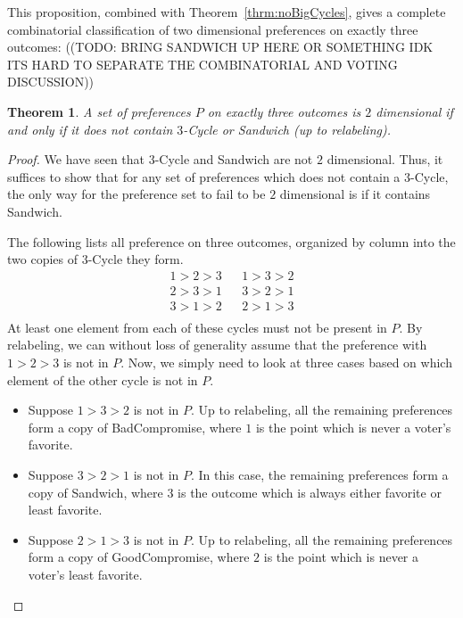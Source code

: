 \documentclass[12pt]{article}
\newtheorem{theorem}{Theorem}
\newcommand{\1}[1]{\mathds{1}[{#1}]}
\begin{document}
    This proposition, combined with Theorem~\ref{thrm:noBigCycles}, gives a
    complete combinatorial classification of two dimensional preferences on
    exactly three outcomes:
    ((TODO: BRING SANDWICH UP HERE OR SOMETHING IDK ITS HARD TO SEPARATE THE
    COMBINATORIAL AND VOTING DISCUSSION))
    \begin{theorem}
      A set of preferences $P$ on exactly three outcomes is $2$ dimensional if
      and only if it does not contain $3$-{\sc Cycle} or {\sc Sandwich} 
      (up to relabeling).
    \end{theorem}
    \begin{proof}
      We have seen that $3$-{\sc Cycle} and {\sc Sandwich} are not $2$
      dimensional.
      Thus, it suffices to show that for any set of preferences which does not
      contain a $3$-{\sc Cycle}, the only way for the preference set to
      fail to be $2$ dimensional is if it contains {\sc Sandwich}.

      The following lists all preference on three outcomes, organized by column
      into the two copies of $3$-{\sc Cycle} they form.
      \begin{align*}
        1 > 2 > 3 && 1 > 3 > 2 \\
        2 > 3 > 1 && 3 > 2 > 1 \\
        3 > 1 > 2 && 2 > 1 > 3 \\
      \end{align*}
      At least one element from each of these cycles must not be present in $P$.
      By relabeling, we can without loss of generality assume that the
      preference with $1 > 2 > 3$ is not in $P$.
      Now, we simply need to look at three cases based on which element of the
      other cycle is not in $P$.
      \begin{itemize}
        \item Suppose $1 > 3 > 2$ is not in $P$.
          Up to relabeling, all the remaining preferences form a copy of
          {\sc BadCompromise}, where $1$ is the point which is never a voter's
          favorite.
        \item Suppose $3 > 2 > 1$ is not in $P$.
          In this case, the remaining preferences form a copy of {\sc Sandwich},
          where $3$ is the outcome which is always either favorite or least
          favorite.
        \item Suppose $2 > 1 > 3$ is not in $P$.
          Up to relabeling, all the remaining preferences form a copy of
          {\sc GoodCompromise}, where $2$ is the point which is never a voter's
          least favorite.
      \end{itemize}
    \end{proof}
\end{document}
